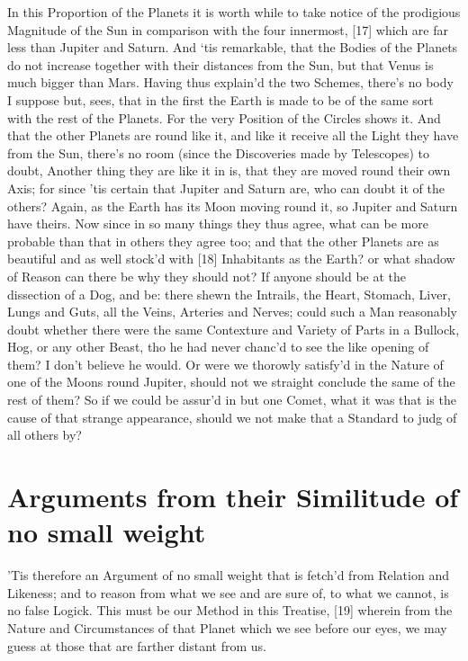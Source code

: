 \documentclass[letterpaper]{book}
\begin{document}
In this Proportion of the Planets it is worth while to take notice of the
prodigious Magnitude of the Sun in comparison with the four innermost, [17]
which are far less than Jupiter and Saturn. And ‘tis remarkable, that the
Bodies of the Planets do not increase together with their distances from the
Sun, but that Venus is much bigger than Mars.  Having thus explain'd the two
Schemes, there's no body I suppose but, sees, that in the first the Earth is
made to be of the same sort with the rest of the Planets. For the very
Position of the Circles shows it. And that the other Planets are round like
it, and like it receive all the Light they have from the Sun, there's no
room (since the Discoveries made by Telescopes) to doubt, Another thing they
are like it in is, that they are moved round their own Axis; for since 'tis
certain that Jupiter and Saturn are, who can doubt it of the others? Again,
as the Earth has its Moon moving round it, so Jupiter and Saturn have
theirs. Now since in so many things they thus agree, what can be more
probable than that in others they agree too; and that the other Planets are
as beautiful and as well stock'd with [18] Inhabitants as the Earth? or what
shadow of Reason can there be why they should not?  If anyone should be at
the dissection of a Dog, and be: there shewn the Intrails, the Heart,
Stomach, Liver, Lungs and Guts, all the Veins, Arteries and Nerves; could
such a Man reasonably doubt whether there were the same Contexture and
Variety of Parts in a Bullock, Hog, or any other Beast, tho he had never
chanc'd to see the like opening of them? I don't believe he would. Or were
we thorowly satisfy'd in the Nature of one of the Moons round Jupiter,
should not we straight conclude the same of the rest of them?  So if we
could be assur'd in but one Comet, what it was that is the cause of that
strange appearance, should we not make that a Standard to judg of all others
by?


\section{Arguments from their Similitude of no small weight}

'Tis therefore an Argument of no small weight that is fetch'd from Relation
and Likeness; and to reason from what we see and are sure of, to what we
cannot, is no false Logick. This must be our Method in this Treatise, [19]
wherein from the Nature and Circumstances of that Planet which we see
before our eyes, we may guess at those that are farther distant from us.
\end{document}
